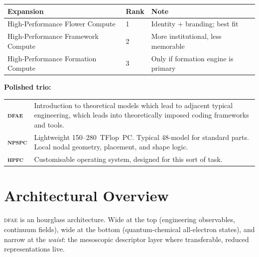 \documentclass[11pt,a4paper]{article}
\theoremstyle{definition}
\theoremstyle{plain}
\newcommand{\DFAE}{\textsc{dfae}}
\newcommand{\NPSPC}{\textsc{npspc}}
\newcommand{\HPFC}{\textsc{hpfc}}
\begin{document}
\begin{center}
\begin{tabular}{@{}lll@{}}
\toprule
\textbf{Expansion} & \textbf{Rank} & \textbf{Note} \\
\midrule
High-Performance Flower Compute   & 1 & Identity + branding; best fit \\
High-Performance Framework Compute & 2 & More institutional, less memorable \\
High-Performance Formation Compute & 3 & Only if formation engine is primary \\
\bottomrule
\end{tabular}
\end{center}

\bigskip
\noindent
\textbf{Polished trio:}
\begin{center}
\begin{tabular}{@{}lp{9cm}@{}}
\toprule
\textbf{\DFAE{}} &
  Introduction to theoretical models which lead to adjacent
  typical engineering, which leads into theoretically imposed
  coding frameworks and tools. \\
\addlinespace
\textbf{\NPSPC{}} &
  Lightweight 150--280~TFlop~PC.  Typical 48-model for standard
  parts.  Local nodal geometry, placement, and shape logic. \\
\addlinespace
\textbf{\HPFC{}} &
  Customisable operating system, designed for this sort of task. \\
\bottomrule
\end{tabular}
\end{center}


\section{Architectural Overview}
\label{sec:arch}

\DFAE{} is an hourglass architecture.  Wide at the top (engineering
observables, continuum fields), wide at the bottom (quantum-chemical
all-electron states), and narrow at the \emph{waist}: the mesoscopic
descriptor layer where transferable, reduced representations live.
\end{document}
